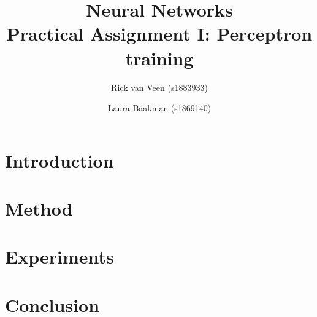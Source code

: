 \documentclass[twoside, a4paper]{article}
\title{Neural Networks\\Practical Assignment I: Perceptron training}
\author{Rick van Veen (s1883933) \and Laura Baakman (s1869140)}
\begin{document}
\maketitle



\begin{multicols}{2}

\section{Introduction}

	
\section{Method}
	

\section{Experiments}
	

\section{Conclusion}


\printbibliography

\end{multicols}
\end{document}
